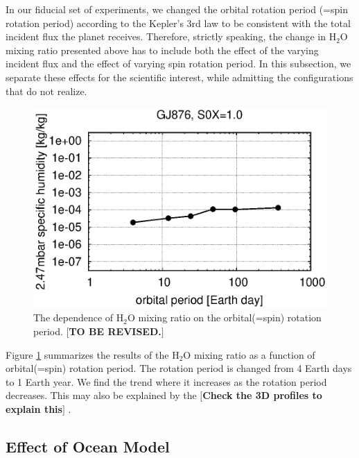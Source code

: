 \documentclass[11pt,numberedappendix,twocolappendix,]{emulateapj}
\def\water{H$_2$O }
\def\memo#1{\color{red}$[${\bf #1}$]$ \color{black}}
\begin{document}
In our fiducial set of experiments, we changed the orbital rotation period (=spin rotation period) according to the Kepler's 3rd law to be consistent with the total incident flux the planet receives. 
Therefore, strictly speaking, the change in \water mixing ratio presented above has to include both the effect of the varying incident flux and the effect of varying spin rotation period. 
In this subsection, we separate these effects for the scientific interest, while admitting the configurations that do not realize. 

\begin{figure}[!h]
    \begin{center}
    \includegraphics[width=\hsize]{fig/AqOH0TLS_GJ876_q_sensitivity_changeP.eps}
    \end{center}
\caption{The dependence of \water mixing ratio on the orbital(=spin) rotation period. \memo{TO BE REVISED.}}                                                                                                             
\label{fig:changeP}
\end{figure}

Figure \ref{fig:changeP} summarizes the results of the \water mixing ratio as a function of orbital(=spin) rotation period. 
The rotation period is changed from 4 Earth days to 1 Earth year. 
We find the trend where it increases as the rotation period decreases. 
This may also be explained by the 
\memo{Check the 3D profiles to explain this}. 

\subsection{Effect of Ocean Model}
\label{ss:sensitivity_ocean}
\end{document}
